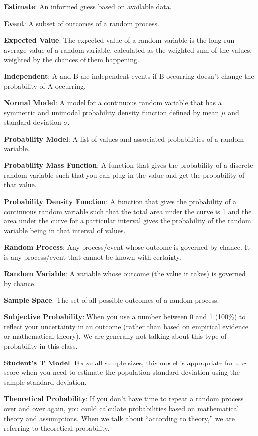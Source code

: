 \documentclass[]{book}
\begin{document}
\textbf{Estimate}: An informed guess based on available data.

\textbf{Event}: A subset of outcomes of a random process.

\textbf{Expected Value}: The expected value of a random variable is the long run average value of a random variable, calculated as the weighted sum of the values, weighted by the chances of them happening.

\textbf{Independent}: A and B are independent events if B occurring doesn't change the probability of A occurring.

\textbf{Normal Model}: A model for a continuous random variable that has a symmetric and unimodal probability density function defined by mean \(\mu\) and standard deviation \(\sigma\).

\textbf{Probability Model}: A list of values and associated probabilities of a random variable.

\textbf{Probability Mass Function}: A function that gives the probability of a discrete random variable such that you can plug in the value and get the probability of that value.

\textbf{Probability Density Function}: A function that gives the probability of a continuous random variable such that the total area under the curve is 1 and the area under the curve for a particular interval gives the probability of the random variable being in that interval of values.

\textbf{Random Process}: Any process/event whose outcome is governed by chance. It is any process/event that cannot be known with certainty.

\textbf{Random Variable}: A variable whose outcome (the value it takes) is governed by chance.

\textbf{Sample Space}: The set of all possible outcomes of a random process.

\textbf{Subjective Probability}: When you use a number between 0 and 1 (100\%) to reflect your uncertainty in an outcome (rather than based on empirical evidence or mathematical theory). We are generally not talking about this type of probability in this class.

\textbf{Student's T Model}: For small sample sizes, this model is appropriate for a z-score when you need to estimate the population standard deviation using the sample standard deviation.

\textbf{Theoretical Probability}: If you don't have time to repeat a random process over and over again, you could calculate probabilities based on mathematical theory and assumptions. When we talk about ``according to theory,'' we are referring to theoretical probability.
\end{document}
